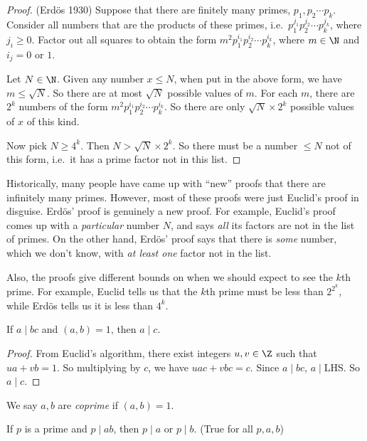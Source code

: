 \documentclass[a4paper]{article}
\begin{document}
\begin{proof}
  (Erd\"{o}s 1930) Suppose that there are finitely many primes, $p_1, p_2\cdots p_k$. Consider all numbers that are the products of these primes, i.e.\ $p_1^{j_1}p_2^{j_2}\cdots p_k^{j_k}$, where $j_i \geq 0$. Factor out all squares to obtain the form $m^2p_1^{i_1}p_2^{i_2}\cdots p_k^{i_k}$, where $m\in \N$ and $i_j = 0$ or $1$.

  Let $N\in\N$. Given any number $x \leq N$, when put in the above form, we have $m \leq \sqrt{N}$. So there are at most $\sqrt{N}$ possible values of $m$. For each $m$, there are $2^k$ numbers of the form $m^2p_1^{i_1}p_2^{i_2}\cdots p_k^{i_k}$. So there are only $\sqrt{N}\times 2^k$ possible values of $x$ of this kind.

  Now pick $N\geq 4^k$. Then $N > \sqrt{N}\times 2^k$. So there must be a number $\leq N$ not of this form, i.e.\ it has a prime factor not in this list.
\end{proof}
Historically, many people have came up with ``new'' proofs that there are infinitely many primes. However, most of these proofs were just Euclid's proof in disguise. Erd\"os' proof is genuinely a new proof. For example, Euclid's proof comes up with a \emph{particular} number $N$, and says \emph{all} its factors are not in the list of primes. On the other hand, Erd\"os' proof says that there is \emph{some} number, which we don't know, with \emph{at least one} factor not in the list.

Also, the proofs give different bounds on when we should expect to see the $k$th prime. For example, Euclid tells us that the $k$th prime must be less than $2^{2^k}$, while Erd\"os tells us it is less than $4^k$.

\begin{thm}
  If $a\mid bc$ and $(a, b) = 1$, then $a \mid c$.
\end{thm}

\begin{proof}
  From Euclid's algorithm, there exist integers $u, v\in \Z$ such that $ua + vb = 1$. So multiplying by $c$, we have $uac + vbc = c$. Since $a \mid bc$, $a \mid $LHS. So $a \mid c$.
\end{proof}

\begin{defi}
  We say $a, b$ are \emph{coprime} if $(a, b) = 1$.
\end{defi}

\begin{cor}
  If $p$ is a prime and $p\mid ab$, then $p\mid a$ or $p\mid b$. (True for all $p, a, b$)
\end{cor}
\end{document}
